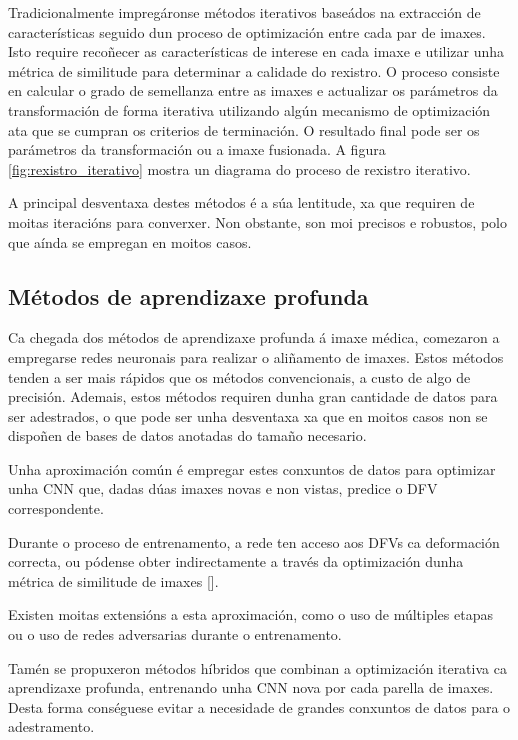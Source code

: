Tradicionalmente impregáronse métodos iterativos baseádos na extracción de características 
seguido dun proceso de optimización entre cada par de imaxes. 
Isto require recoñecer as características de interese en cada imaxe e utilizar unha métrica de similitude 
para determinar a calidade do rexistro.
O proceso consiste en calcular o grado de semellanza entre as imaxes e 
actualizar os parámetros da transformación de forma iterativa utilizando algún mecanismo de optimización
 ata que se cumpran os criterios de terminación.
O resultado final pode ser os parámetros da transformación ou a imaxe fusionada.
A figura \ref{fig:rexistro_iterativo} mostra un diagrama do proceso de rexistro iterativo.

A principal desventaxa destes métodos é a súa lentitude, xa que requiren de moitas iteracións para converxer.
Non obstante, son moi precisos e robustos, polo que aínda se empregan en moitos casos.

\subsection{Métodos de aprendizaxe profunda}
\label{subsec:Métodos de aprendizaxe profunda}

Ca chegada dos métodos de aprendizaxe profunda á imaxe médica, comezaron a empregarse redes neuronais para realizar o aliñamento de imaxes.
Estos métodos tenden a ser mais rápidos que os métodos convencionais, a custo de algo de precisión. 
Ademais, estos métodos requiren dunha gran cantidade de datos para ser adestrados, 
o que pode ser unha desventaxa xa que en moitos casos non se dispoñen de bases de datos anotadas do tamaño necesario.

Unha aproximación común é empregar estes conxuntos de datos para optimizar unha CNN que,
 dadas dúas imaxes novas e non vistas, predice o DFV correspondente.

Durante o proceso de entrenamento, a rede ten acceso aos DFVs ca deformación correcta,
 ou pódense obter indirectamente a través da optimización dunha métrica de similitude de imaxes [].

Existen moitas extensións a esta aproximación, como o uso de múltiples etapas ou o uso de redes adversarias durante o entrenamento.

Tamén se propuxeron métodos híbridos que combinan a optimización iterativa ca aprendizaxe profunda, 
entrenando unha CNN nova por cada parella de imaxes. Desta forma conséguese evitar a necesidade de grandes conxuntos de datos para o adestramento.

